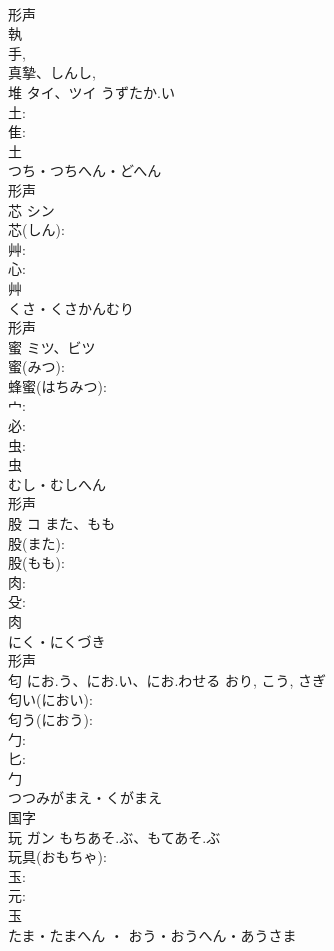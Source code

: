 \documentclass[8pt]{extreport}
\begin{document}
\begin{CJK}{UTF8}{min}
\\	形声 
\\	執 
\\	手, 
\\	真摯、しんし, 
\\	堆	タイ、ツイ	うずたか.い		
\\	土: 
\\	隹: 
\\	土	
\\	つち・つちへん・どへん	
\\	形声 
\\	芯	シン			
\\	芯(しん): 
\\	艸: 
\\	心: 
\\	艸	
\\	くさ・くさかんむり	
\\	形声 
\\	蜜	ミツ、ビツ			
\\	蜜(みつ): 
\\	蜂蜜(はちみつ): 
\\	宀: 
\\	必: 
\\	虫: 
\\	虫	
\\	むし・むしへん	
\\	形声 
\\	股	コ	また、もも		
\\	股(また): 
\\	股(もも): 
\\	肉: 
\\	殳: 
\\	肉	
\\	にく・にくづき	
\\	形声 
\\	匂		にお.う、にお.い、にお.わせる	おり, こう, さぎ	
\\	匂い(におい): 
\\	匂う(におう): 
\\	勹: 
\\	匕: 
\\	勹	
\\	つつみがまえ・くがまえ	
\\	国字 
\\	玩	ガン	もちあそ.ぶ、もてあそ.ぶ		
\\	玩具(おもちゃ): 
\\	玉: 
\\	元: 
\\	玉	
\\	たま・たまへん ・ おう・おうへん・あうさま	

\end{CJK}
\end{document}
